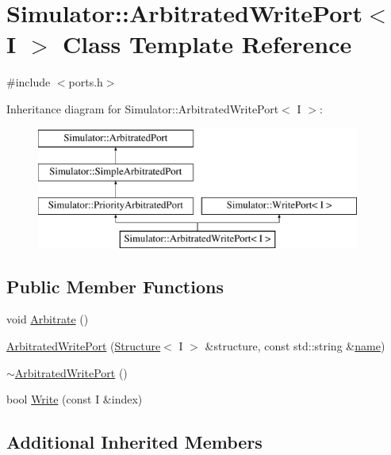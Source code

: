 \hypertarget{singleton_simulator_1_1_arbitrated_write_port}{\section{Simulator\+:\+:Arbitrated\+Write\+Port$<$ I $>$ Class Template Reference}
\label{singleton_simulator_1_1_arbitrated_write_port}
}


{\ttfamily \#include $<$ports.\+h$>$}

Inheritance diagram for Simulator\+:\+:Arbitrated\+Write\+Port$<$ I $>$\+:\begin{figure}[H]
\begin{center}
\leavevmode
\includegraphics[height=4.000000cm]{singleton_simulator_1_1_arbitrated_write_port}
\end{center}
\end{figure}
\subsection*{Public Member Functions}
\begin{DoxyCompactItemize}
\item 
void \hyperlink{singleton_simulator_1_1_arbitrated_write_port_aeb84f0a2255125ae16559efe8d87e724}{Arbitrate} ()
\item 
\hyperlink{singleton_simulator_1_1_arbitrated_write_port_ad6a5c673dbc38abf6ce594ab15c23ead}{Arbitrated\+Write\+Port} (\hyperlink{singleton_simulator_1_1_structure}{Structure}$<$ I $>$ \&structure, const std\+::string \&\hyperlink{mtconf_8c_a8f8f80d37794cde9472343e4487ba3eb}{name})
\item 
\hyperlink{singleton_simulator_1_1_arbitrated_write_port_a33c8f212281052776f0cea1390e7d137}{$\sim$\+Arbitrated\+Write\+Port} ()
\item 
bool \hyperlink{singleton_simulator_1_1_arbitrated_write_port_aef7e5553ca6e808e1184a671faf19ae9}{Write} (const I \&index)
\end{DoxyCompactItemize}
\subsection*{Additional Inherited Members}



